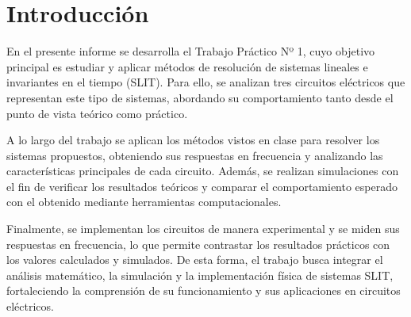 \section{Introducción}
\label{chap:introduccion}
En el presente informe se desarrolla el Trabajo Práctico Nº 1, cuyo objetivo principal es estudiar y aplicar métodos
de resolución de sistemas lineales e invariantes en el tiempo (SLIT). Para ello, se analizan tres circuitos eléctricos
que representan este tipo de sistemas, abordando su comportamiento tanto desde el punto de vista teórico como práctico.

A lo largo del trabajo se aplican los métodos vistos en clase para resolver los sistemas propuestos, obteniendo sus
respuestas en frecuencia y analizando las características principales de cada circuito. Además, se realizan
simulaciones con el fin de verificar los resultados teóricos y comparar el comportamiento esperado con el obtenido
mediante herramientas computacionales.

Finalmente, se implementan los circuitos de manera experimental y se miden sus respuestas en frecuencia, lo que permite
contrastar los resultados prácticos con los valores calculados y simulados. De esta forma, el trabajo busca integrar
el análisis matemático, la simulación y la implementación física de sistemas SLIT, fortaleciendo la comprensión de su
funcionamiento y sus aplicaciones en circuitos eléctricos.
